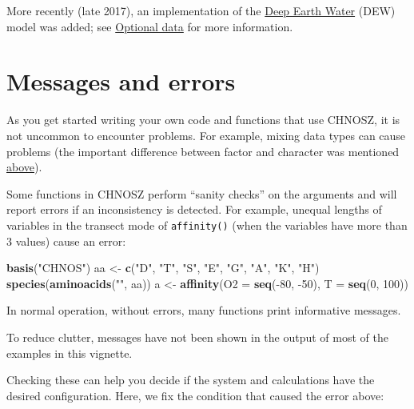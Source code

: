 \documentclass[]{tufte-book}
\newenvironment{Shaded}{}{}
\newcommand{\KeywordTok}[1]{\textcolor[rgb]{0.00,0.44,0.13}{\textbf{#1}}}
\newcommand{\DataTypeTok}[1]{\textcolor[rgb]{0.56,0.13,0.00}{#1}}
\newcommand{\DecValTok}[1]{\textcolor[rgb]{0.25,0.63,0.44}{#1}}
\newcommand{\StringTok}[1]{\textcolor[rgb]{0.25,0.44,0.63}{#1}}
\newcommand{\OperatorTok}[1]{\textcolor[rgb]{0.40,0.40,0.40}{#1}}
\newcommand{\NormalTok}[1]{#1}
\begin{document}
More recently (late 2017), an implementation of the
\href{http://www.dewcommunity.org/}{Deep Earth Water} (DEW) model was
added; see \protect\hyperlink{optional-data}{Optional data} for more
information.

\chapter{Messages and errors}\label{messages-and-errors}

As you get started writing your own code and functions that use CHNOSZ,
it is not uncommon to encounter problems. For example, mixing data types
can cause problems (the important difference between factor and
character was mentioned \protect\hyperlink{adding-data}{above}).

Some functions in CHNOSZ perform ``sanity checks'' on the arguments and
will report errors if an inconsistency is detected. For example, unequal
lengths of variables in the transect mode of {\texttt{affinity()}} (when
the variables have more than 3 values) cause an error:

\begin{Shaded}
\begin{Highlighting}[]
\KeywordTok{basis}\NormalTok{(}\StringTok{"CHNOS"}\NormalTok{)}
\NormalTok{aa <-}\StringTok{ }\KeywordTok{c}\NormalTok{(}\StringTok{"D"}\NormalTok{, }\StringTok{"T"}\NormalTok{, }\StringTok{"S"}\NormalTok{, }\StringTok{"E"}\NormalTok{, }\StringTok{"G"}\NormalTok{, }\StringTok{"A"}\NormalTok{, }\StringTok{"K"}\NormalTok{, }\StringTok{"H"}\NormalTok{)}
\KeywordTok{species}\NormalTok{(}\KeywordTok{aminoacids}\NormalTok{(}\StringTok{""}\NormalTok{, aa))}
\NormalTok{a <-}\StringTok{ }\KeywordTok{affinity}\NormalTok{(}\DataTypeTok{O2 =} \KeywordTok{seq}\NormalTok{(}\OperatorTok{-}\DecValTok{80}\NormalTok{, }\OperatorTok{-}\DecValTok{50}\NormalTok{), }\DataTypeTok{T =} \KeywordTok{seq}\NormalTok{(}\DecValTok{0}\NormalTok{, }\DecValTok{100}\NormalTok{))}
\end{Highlighting}
\end{Shaded}

In normal operation, without errors, many functions print informative
messages.

\begin{marginfigure}
To reduce clutter, messages have not been shown in the output of most of
the examples in this vignette.
\end{marginfigure}

Checking these can help you decide if the system and calculations have
the desired configuration. Here, we fix the condition that caused the
error above:
\end{document}
